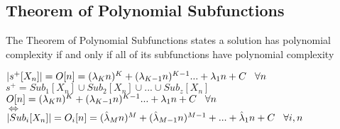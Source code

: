 \documentclass[11pt]{article}
\begin{document}






\subsection{Theorem of Polynomial Subfunctions}
The Theorem of Polynomial Subfunctions states a solution has polynomial complexity if and only if all of its subfunctions have polynomial complexity
\begin{center}
$
|s^+[X_n]| = O[n] = (\lambda_K n)^K + (\lambda_{K-1} n)^{K-1}... + \lambda_1 n + C \hspace{3mm} \forall n
$
\\ \vspace{4mm}
$
s^+ = Sub_1[X_n] \cup Sub_2[X_n] \cup ... \cup Sub_z[X_n]
$
\\ \vspace{8mm}
$
O[n] = (\lambda_K n)^K + (\lambda_{K-1} n)^{K-1}... + \lambda_1 n + C \hspace{3mm} \forall n
$
\\ \vspace{2mm}
$
\Longleftrightarrow
$
\\ \vspace{2mm}
$
|Sub_i[X_n]| = O_i[n] = (\hat{\lambda}_M n)^M + (\hat{\lambda}_{M-1} n)^{M-1} + ... + \hat{\lambda}_1 n + C \hspace{3mm} \forall i,n
$
\end{center}
\end{document}
